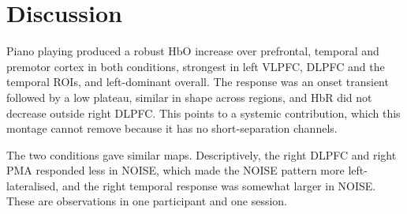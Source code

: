 \documentclass[11pt,a4paper]{article}
\begin{document}
\section{Discussion}
Piano playing produced a robust HbO increase over prefrontal, temporal and
premotor cortex in both conditions, strongest in left VLPFC, DLPFC and the
temporal ROIs, and left-dominant overall. The response was an onset transient
followed by a low plateau, similar in shape across regions, and HbR did not
decrease outside right DLPFC. This points to a systemic contribution, which
this montage cannot remove because it has no short-separation channels.

The two conditions gave similar maps. Descriptively, the right DLPFC and
right PMA responded less in NOISE, which made the NOISE pattern more
left-lateralised, and the right temporal response was somewhat larger in
NOISE. These are observations in one participant and one session.
\end{document}
